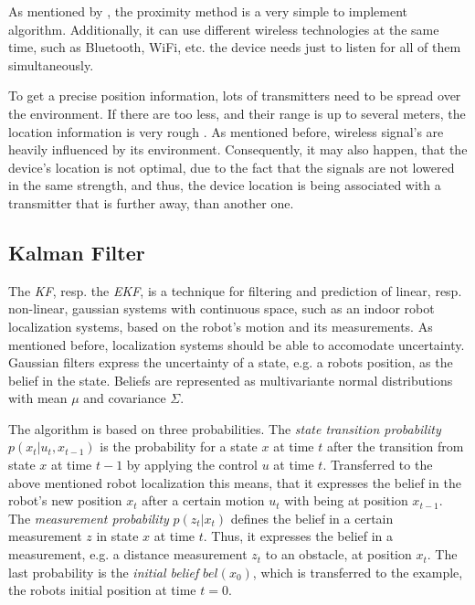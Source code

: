 As mentioned by \citet{IEEE:survey_wireless_indoor_pos}, the proximity method is a very simple to implement algorithm. Additionally, it can use different wireless technologies at the same time, such as Bluetooth, WiFi, etc.\; the device needs just to listen for all of them simultaneously. 

To get a precise position information, lots of transmitters need to be spread over the environment. If there are too less, and their range is up to several meters, the location information is very rough \citep{kotanen:exp_local_pos_bt}. As mentioned before, wireless signal's are heavily influenced by its environment. Consequently, it may also happen, that the device's location is not optimal, due to the fact that the signals are not lowered in the same strength, and thus, the device location is being associated with a transmitter that is further away, than another one.

\subsection{Kalman Filter}\label{sec:fund_kf}
The \emph{\ac{KF}}, resp. the \emph{\ac{EKF}}, is a technique for filtering and prediction of linear, resp. non-linear, gaussian systems with continuous space, such as an indoor robot localization systems, based on the robot's motion and its measurements. As mentioned before, localization systems should be able to accomodate uncertainty. Gaussian filters express the uncertainty of a state, e.g. a robots position, as the belief in the state. Beliefs are represented as multivariante normal distributions with mean $\mu$ and covariance $\Sigma$.

The algorithm is based on three probabilities. The \emph{state transition probability} $p(x_t | u_t , x_{t-1})$ is the probability for a state $x$ at time $t$ after the transition from state $x$ at time $t-1$ by applying the control $u$ at time $t$. Transferred to the above mentioned robot localization this means, that it expresses the belief in the robot's new position $x_t$ after a certain motion $u_t$ with being at position $x_{t-1}$. The \emph{measurement probability} $p(z_t|x_t)$ defines the belief in a certain measurement $z$ in state $x$ at time $t$. Thus, it expresses the belief in a measurement, e.g. a distance measurement $z_t$ to an obstacle, at position $x_t$. The last probability is the \emph{initial belief} $bel(x_0)$, which is transferred to the example, the robots initial position at time $t = 0$.


